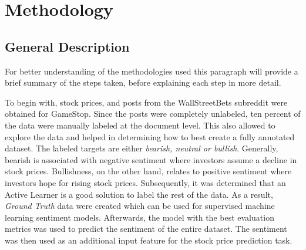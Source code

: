 \documentclass[11pt, a4paper]{article}
\begin{document}


\section{Methodology}

\subsection{General Description} \label{general_description}

For better understanding of the methodologies used this paragraph will provide a brief summary of the steps taken, before
explaining each step in more detail.

To begin with, stock prices, and posts from the WallStreetBets subreddit were obtained for GameStop. Since the posts were completely
unlabeled, ten percent of the data were manually labeled at the document level. This also allowed to explore the data and helped in determining how to best create a fully annotated dataset.
The labeled targets are either \emph{bearish, neutral or bullish}. Generally, bearish is associated with negative 
sentiment where investors assume a decline in stock prices. Bullishness, on the other hand, relates to positive sentiment where investors hope for rising stock prices.
Subsequently, it was determined that an Active Learner is a good solution to label the rest of the data. As a result, \emph{Ground Truth} data were created which can be used
for supervised machine learning sentiment models. Afterwards, the model with the best evaluation metrics was used to predict the sentiment of the entire
dataset. The sentiment was then used as an additional input feature for the stock price prediction task.
\end{document}
